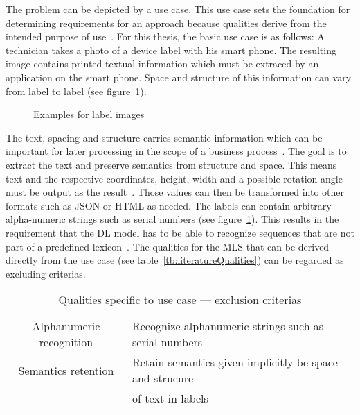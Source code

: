 The problem can be depicted by a use case.
This use case sets the foundation for determining requirements for an
approach because qualities derive from the intended purpose of
use~\citep{siebert_construction_2021}.
For this thesis, the basic use case is as follows:
A technician takes a photo of a device label with his smart phone.
The resulting image contains printed textual information which must be extraced by an application on
the smart phone.
Space and structure of this information can vary from label to label (see figure~\ref{fig:examples}).
\begin{figure}[h]
    \centering
    \caption{Examples for label images\label{fig:examples}}
\end{figure}
The text, spacing and structure carries semantic information which can be important for later
processing in the scope of a business process~\citep{chen_text_2021}.
The goal is to extract the text and preserve semantics from structure and space.
This means text and the respective coordinates, height, width and a possible rotation angle must
be output as the result~\citep{yang_learning_2021}.
Those values can then be transformed into other formats such as JSON or HTML as needed.
The labels can contain arbitrary alpha-numeric strings such as serial numbers (see
figure~\ref{fig:examples}).
This results in the requirement that the \ac{DL} model has to be able to recognize sequences that
are not part of a predefined lexicon~\citep{ghosh_visual_2017}.
The qualities for the \ac{MLS} that can be derived directly from the use case (see
table~\ref{tb:literatureQualities}) can be regarded as excluding criterias.
\begin{table}[h]
    \centering
    \begin{tabular}{c l}
        Alphanumeric recognition & Recognize alphanumeric strings such as serial numbers \\
        Semantics retention & Retain semantics given implicitly be space and strucure \\
                            & of text in labels \\
    \end{tabular}
    \caption{Qualities specific to use case --- exclusion criterias}
\end{table}

